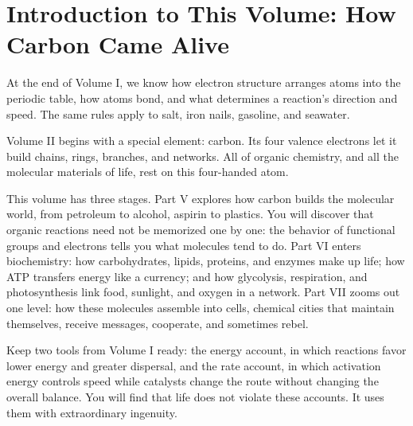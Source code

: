 \chapter*{Introduction to This Volume: How Carbon Came Alive}

At the end of Volume I, we know how electron structure arranges atoms into the periodic table, how atoms bond, and what determines a reaction's direction and speed. The same rules apply to salt, iron nails, gasoline, and seawater.

Volume II begins with a special element: carbon. Its four valence electrons let it build chains, rings, branches, and networks. All of organic chemistry, and all the molecular materials of life, rest on this four-handed atom.

This volume has three stages. Part V explores how carbon builds the molecular world, from petroleum to alcohol, aspirin to plastics. You will discover that organic reactions need not be memorized one by one: the behavior of functional groups and electrons tells you what molecules tend to do. Part VI enters biochemistry: how carbohydrates, lipids, proteins, and enzymes make up life; how ATP transfers energy like a currency; and how glycolysis, respiration, and photosynthesis link food, sunlight, and oxygen in a network. Part VII zooms out one level: how these molecules assemble into cells, chemical cities that maintain themselves, receive messages, cooperate, and sometimes rebel.

Keep two tools from Volume I ready: the energy account, in which reactions favor lower energy and greater dispersal, and the rate account, in which activation energy controls speed while catalysts change the route without changing the overall balance. You will find that life does not violate these accounts. It uses them with extraordinary ingenuity.
